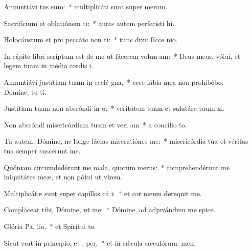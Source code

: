 \item Annuntiávi  tus sum:~* multiplicáti sunt super merum.
\item Sacrifícium et oblatiónem ti:~* aures autem perfecísti hi.
\item Holocáustum et pro peccáto non ti:~* tunc dixi: Ecce nio.
\item In cápite libri scriptum est de me ut fácerem volun am:~* Deus meus, vólui, et legem tuam in médio cordis i.
\item Annuntiávi justítiam tuam in ecclé gna,~* ecce lábia mea non prohibébo: Dómine, tu ti.
\item Justítiam tuam non abscóndi in  o:~* veritátem tuam et salutáre tuum xi.
\item Non abscóndi misericórdiam tuam et veri am~* a concílio to.
\item Tu autem, Dómine, ne longe fácias miseratiónes   me:~* misericórdia tua et véritas tua semper suscerunt me.
\item Quóniam circumdedérunt me mala, quorum   merus:~* comprehendérunt me iniquitátes meæ, et non pótui ut virem.
\item Multiplicátæ sunt super capíllos cá i:~* et cor meum derequit me.
\item Compláceat tibi, Dómine, ut  me:~* Dómine, ad adjuvándum me spice.
\item Glória Pa,  lio,~* et Spirítui to.
\item Sicut erat in princípio, et ,  per,~* et in sǽcula sæculórum. men.
